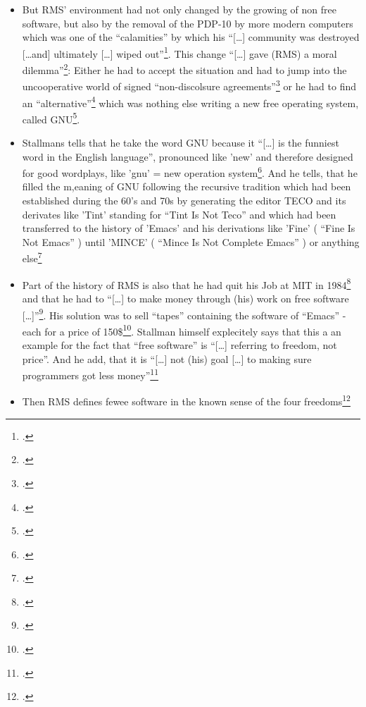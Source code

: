 \documentclass[DIV=calc,BCOR=5mm,11pt,headings=small,oneside,abstract=true, toc=bib]{scrartcl}
\begin{document}
\begin{itemize}
  had to sign a non-disclosure agreement\footcite[cf][159]{Stallman2001a}
  \item But RMS' environment had not only changed by the growing of non free
  software, but also by the removal of the PDP-10 by more modern computers which
  was one of the \enquote{calamities} by which his \enquote{[\ldots]
  community was destroyed [\ldots and] ultimately [\ldots] wiped
  out}\footcite[cf][157 (richtige Seite!)]{Stallman2001a}. This change
  \enquote{[\ldots] gave (RMS) a moral dilemma}\footcite[cf][159 (richtige
  Seite!)]{Stallman2001a}: Either he had to accept the situation and had to jump
  into the uncooperative world of signed \enquote{non-discolsure
  agreements}\footcite[cf][159]{Stallman2001a} or he had to find an
  \enquote{alternative}\footcite[cf][160]{Stallman2001a} which was nothing
  else writing a new free operating system, called
  GNU\footcite[cf][161]{Stallman2001a}.
  \item Stallmans tells that he take the word GNU because it \enquote{[\ldots]
  is the funniest word in the English language}, pronounced like 'new' and
  therefore designed for good wordplays, like 'gnu' = new operation
  system\footcite[cf][161]{Stallman2001a}. And he tells, that he filled the
  m,eaning of GNU following the recursive tradition which had been established
  during the 60's and 70s by generating the editor TECO and its derivates like
  'Tint' standing for \enquote{Tint Is Not Teco} and which had been
  transferred to the history of 'Emacs' and his derivations like 'Fine' (
  \enquote{Fine Is Not Emacs} ) until 'MINCE' ( \enquote{Mince Is Not
  Complete Emacs} ) or anything else\footcite[cf][161]{Stallman2001a}
  \item Part of the history of RMS is also that he had quit his Job at MIT in
  1984\footcite[cf][162]{Stallman2001a} and that he had to \enquote{[\ldots]
  to make money through (his) work on free software
  [\ldots]}\footcite[cf][162]{Stallman2001a}. His solution was to sell
  \enquote{tapes} containing the software of \enquote{Emacs} - each for
  a price of 150\$\footcite[cf][162]{Stallman2001a}. Stallman himself
  explecitely says that this a an example for the fact that \enquote{free
  software} is \enquote{[\ldots] referring to freedom, not price}. And
  he add, that it is \enquote{[\ldots] not (his) goal [\ldots] to making
  sure programmers got less money}\footcite[cf][163]{Stallman2001a}
  \item Then RMS defines fewee software in the known sense of the four
  freedoms\footcite[cf][163ff]{Stallman2001a}

\end{itemize}
\end{document}
